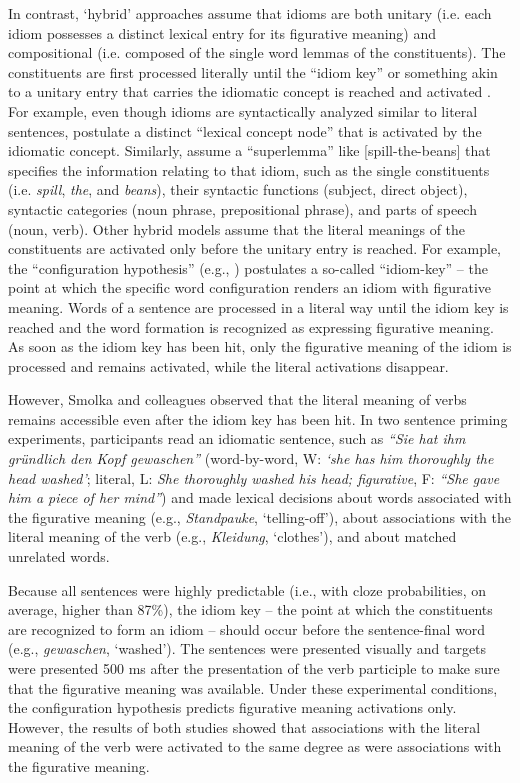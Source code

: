 \documentclass[output=paper]{langsci/langscibook}
\begin{document}
In contrast, ‘hybrid’ approaches assume that idioms are both unitary (i.e. each idiom possesses a distinct lexical entry for its figurative meaning) and compositional (i.e. composed of the single word lemmas of the constituents). The constituents are first processed literally until the ``idiom key'' or something akin to a unitary entry that carries the idiomatic concept is reached and activated \citep{cacciari:1988,caillies:2007,connine:1992,cutting:1997,gibbs:1989,holsinger:2013,sprenger:2006,titone:1999}. For example, even though idioms are syntactically analyzed similar to literal sentences, \citealt{cutting:1997} postulate a distinct ``lexical concept node'' that is activated by the idiomatic concept. Similarly, \citealt{sprenger:2006} assume a ``superlemma'' like [spill-the-beans] that specifies the information relating to that idiom, such as the single constituents (i.e. \textit{spill}, \textit{the}, and \textit{beans}), their syntactic functions (subject, direct object), syntactic categories (noun phrase, prepositional phrase), and parts of speech (noun, verb). Other hybrid models assume that the literal meanings of the constituents are activated only before the unitary entry is reached. For example, the ``configuration hypothesis'' (e.g., \citealt{cacciari:1988}) postulates a so-called ``idiom-key'' – the point at which the specific word configuration renders an idiom with figurative meaning. Words of a sentence are processed in a literal way until the idiom key is reached and the word formation is recognized as expressing figurative meaning. As soon as the idiom key has been hit, only the figurative meaning of the idiom is processed and remains activated, while the literal activations disappear. 

However, Smolka and colleagues \citep{rabanus:2008,smolka:2007} observed that the literal meaning of verbs remains accessible even after the idiom key has been hit. In two sentence priming experiments, participants read an idiomatic sentence, such as \textit{``Sie hat ihm gründlich den Kopf gewaschen''} (word-by-word, W: \textit{‘she has him thoroughly the head washed’}; literal, L: \textit{She thoroughly washed his head; figurative}, F: \textit{``She gave him a piece of her mind''}) and made lexical decisions about words associated with the figurative meaning (e.g., \textit{Standpauke}, ‘telling-off’), about associations with the literal meaning of the verb (e.g., \textit{Kleidung}, ‘clothes’), and about matched unrelated words. 

Because all sentences were highly predictable (i.e., with cloze probabilities, on average, higher than 87\%), the idiom key -- the point at which the constituents are recognized to form an idiom -- should occur before the sentence-final word (e.g., \textit{gewaschen}, ‘washed’). The sentences were presented visually and targets were presented 500 ms after the presentation of the verb participle to make sure that the figurative meaning was available. Under these experimental conditions, the configuration hypothesis \citep{cacciari:1988} predicts figurative meaning activations only.  However, the results of both studies showed that associations with the literal meaning of the verb were activated to the same degree as were associations with the figurative meaning.  
\end{document}
